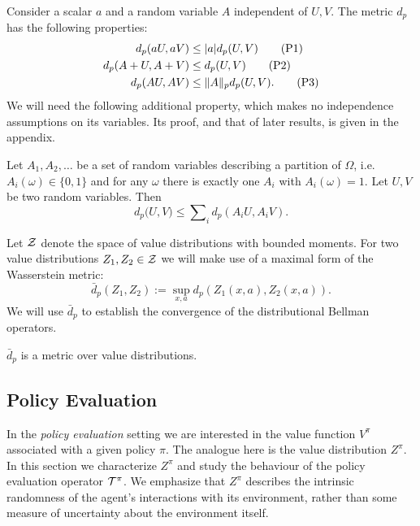 \documentclass{article}
\def \cTpi {\cT^\pi}
\def \dip {\bar d_p}
\begin{document}
Consider a scalar $a$ and a random variable $A$ independent of $U, V$. The metric $d_p$ has the following properties:
\begin{align*}
d_p(aU, aV) &\le |a| d_p(U, V) \tag{P1} \\
d_p(A + U, A + V) &\le d_p(U, V) \tag{P2} \\
d_p(AU, AV) & \le \| A \|_p d_p(U, V). \tag{P3}
\end{align*}
We will need the following additional property, which makes no independence assumptions on its variables.
Its proof, and that of later results, is given in the appendix.
\begin{lem}\label{lem:partition_lemma}
Let $A_1, A_2, \dots$ be a set of random variables describing a partition of $\Omega$, i.e. $A_i(\omega) \in \{0, 1\}$ and for any $\omega$ there is exactly one $A_i$ with $A_i(\omega) = 1$. Let $U, V$ be two random variables. Then
\begin{equation*}
d_p\big (U, V \big) \le \sum\nolimits_i d_p (A_i U, A_i V) .
\end{equation*}
\end{lem}
Let $\mathcal{Z}$ denote the space of value distributions with bounded moments.
For two value distributions $Z_1, Z_2 \in \mathcal{Z}$ we will make use of a maximal form of the Wasserstein metric:
\begin{equation*}
\dip(Z_1, Z_2) := \sup_{x, a} d_p(Z_1(x,a), Z_2(x,a)) .
\end{equation*}
We will use $\dip$ to establish the convergence of the distributional Bellman operators.
%
\begin{lem}
$\dip$ is a metric over value distributions.
\end{lem}

\subsection{Policy Evaluation}\label{sec:policy_evaluation}

In the \emph{policy evaluation} setting \citep{sutton98reinforcement} we are interested in the value function $V^\pi$ associated with a given policy $\pi$. The analogue here is the value distribution $Z^\pi$. In this section we characterize $Z^\pi$ and study the behaviour of the policy evaluation operator $\cTpi$. We emphasize that $Z^\pi$ describes the intrinsic randomness of the agent's interactions with its environment, rather than some measure of uncertainty about the environment itself.
%
\end{document}
